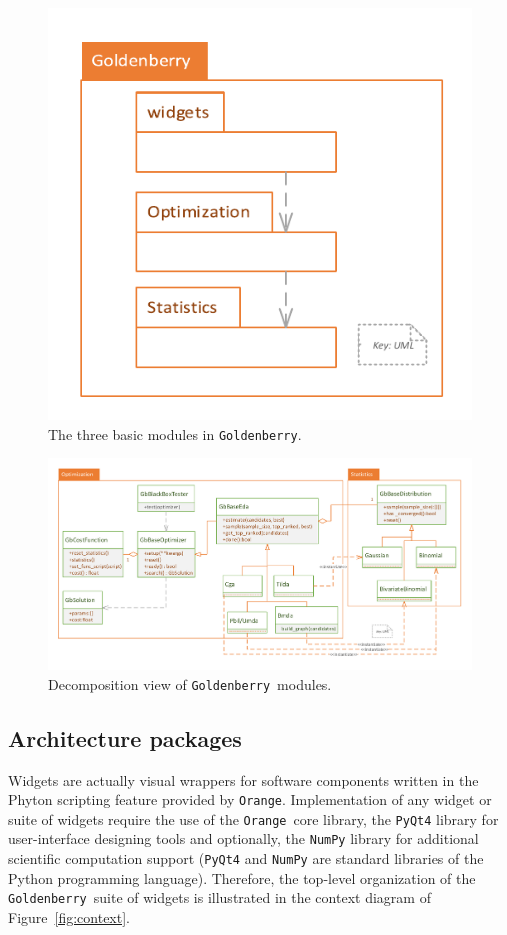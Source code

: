 \documentclass{sig-alternate}
\newcommand{\Orange}{\texttt{Orange}}
\newcommand{\GB}{\texttt{Goldenberry}}
\newcommand{\figref}[1]{\mbox{Figure \ref{#1}}}
\begin{document}
\begin{figure}[H]
	\centering
	\includegraphics[scale=.75]{modules} 
	\caption{The three basic modules in \GB.}
	\label{fig:modules}
\end{figure}


\begin{figure}
\centering
	\includegraphics[scale=.65]{modules_drilldown} 
	\caption{Decomposition view of \GB~modules.}
	\label{fig:modules_drilldown}
\end{figure}

\subsection{Architecture packages}
Widgets are actually visual wrappers for software components written in the Phyton scripting feature provided by \Orange. Implementation of any widget or suite of widgets require the use of the \Orange~core library, the \texttt{PyQt4} library for user-interface designing tools and optionally, the \texttt{NumPy} library for additional scientific computation support (\texttt{PyQt4} and \texttt{NumPy} are standard libraries of the Python programming language). Therefore, the top-level organization of the \GB~suite of widgets is illustrated in the context diagram of \figref{fig:context}.  
\end{document}
